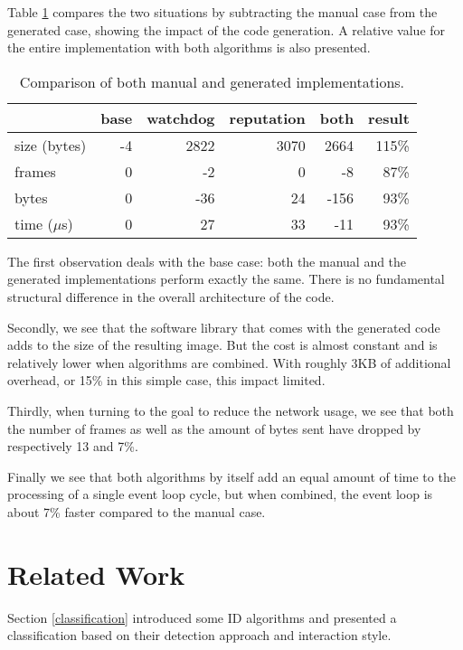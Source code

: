 \documentclass[conference]{IEEEtran}
\begin{document}
Table \ref{tbl:summary} compares the two situations by subtracting the manual
case from the generated case, showing the impact of the code generation. A
relative value for the entire implementation with both algorithms is also
presented.

\begin{table}[H]
  \centering
  \begin{tabular}{lrrrrr}
  \hline
                & base & watchdog & reputation & both  & result \\
  \hline
  size (bytes)  & -4    & 2822     & 3070       & 2664  & 115\%  \\
  frames        & 0     & -2       & 0          & -8    & 87\%   \\
  bytes         & 0     & -36      & 24         & -156  & 93\%   \\
  time ($\mu$s) & 0     & 27       & 33         & -11   & 93\%   \\
  \hline
  \end{tabular}
  \caption{Comparison of both manual and generated implementations.}
  \label{tbl:summary}
\end{table}

The first observation deals with the base case: both the manual and the
generated implementations perform exactly the same. There is no fundamental
structural difference in the overall architecture of the code.

Secondly, we see that the software library that comes with the generated code
adds to the size of the resulting image. But the cost is almost constant and is
relatively lower when algorithms are combined. With roughly 3KB of additional
overhead, or 15\% in this simple case, this impact limited.

Thirdly, when turning to the goal to reduce the network usage, we see that both
the number of frames as well as the amount of bytes sent have dropped by
respectively 13 and 7\%.

Finally we see that both algorithms by itself add an equal amount of time to
the processing of a single event loop cycle, but when combined, the event loop
is about 7\% faster compared to the manual case.

\section{Related Work}
\label{related}

Section \ref{classification} introduced some ID
algorithms\cite{ganeriwal2008reputation,mishra2004intrusion,krontiris2009cooperative}
and presented a classification\cite{mishra2004intrusion,ioannis2007towards,alrajeh2013intrusion}
based on their detection approach and interaction style.
\end{document}
